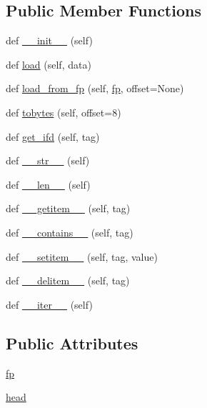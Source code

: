 \subsection*{Public Member Functions}
\begin{DoxyCompactItemize}
\item 
def \hyperlink{classPIL_1_1Image_1_1Exif_a15d7ea75e1a2d1101c4a26ae3632608e}{\+\_\+\+\_\+init\+\_\+\+\_\+} (self)
\item 
def \hyperlink{classPIL_1_1Image_1_1Exif_a3acd278e0ac3d84c67511f7ede2ecabc}{load} (self, data)
\item 
def \hyperlink{classPIL_1_1Image_1_1Exif_aed9d3a49841c3ef6422fc8c857c067fa}{load\+\_\+from\+\_\+fp} (self, \hyperlink{classPIL_1_1Image_1_1Exif_a40050e379fe8ff948d0caae51c17e3a1}{fp}, offset=None)
\item 
def \hyperlink{classPIL_1_1Image_1_1Exif_a2e211ebc131e9aca77d85bed67f40385}{tobytes} (self, offset=8)
\item 
def \hyperlink{classPIL_1_1Image_1_1Exif_a7c3191393d0e843f35764d7507f5ddb7}{get\+\_\+ifd} (self, tag)
\item 
def \hyperlink{classPIL_1_1Image_1_1Exif_a600b41ea38547efee82237371e5fed17}{\+\_\+\+\_\+str\+\_\+\+\_\+} (self)
\item 
def \hyperlink{classPIL_1_1Image_1_1Exif_a7ac1f173a12f1dad60082419d41a3af5}{\+\_\+\+\_\+len\+\_\+\+\_\+} (self)
\item 
def \hyperlink{classPIL_1_1Image_1_1Exif_aa59efbbd9dd51c5c44db3a536823564e}{\+\_\+\+\_\+getitem\+\_\+\+\_\+} (self, tag)
\item 
def \hyperlink{classPIL_1_1Image_1_1Exif_a0c9c2892531ce88f0ca0161ed96c5720}{\+\_\+\+\_\+contains\+\_\+\+\_\+} (self, tag)
\item 
def \hyperlink{classPIL_1_1Image_1_1Exif_aee9a66582db7b7d5fa6ee7a6840ce926}{\+\_\+\+\_\+setitem\+\_\+\+\_\+} (self, tag, value)
\item 
def \hyperlink{classPIL_1_1Image_1_1Exif_a1e13409dd5b47dc196b5466a37b050b0}{\+\_\+\+\_\+delitem\+\_\+\+\_\+} (self, tag)
\item 
def \hyperlink{classPIL_1_1Image_1_1Exif_ace747b42559d855cebca97c11e284588}{\+\_\+\+\_\+iter\+\_\+\+\_\+} (self)
\end{DoxyCompactItemize}
\subsection*{Public Attributes}
\begin{DoxyCompactItemize}
\item 
\hyperlink{classPIL_1_1Image_1_1Exif_a40050e379fe8ff948d0caae51c17e3a1}{fp}
\item 
\hyperlink{classPIL_1_1Image_1_1Exif_ad6d9ea4e49a1be7df274800408a6efc5}{head}
\end{DoxyCompactItemize}
